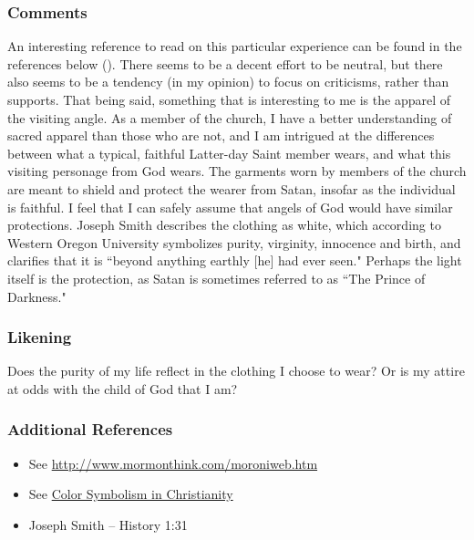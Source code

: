 \documentclass[12pt]{report}
\begin{document}
\subsubsection{Comments\label{js:comments4}}
An interesting reference to read on this particular experience can be found in the references below ().  There seems to be a decent effort to be neutral, but there also seems to be a tendency (in my opinion) to focus on criticisms, rather than supports.  That being said, something that is interesting to me is the apparel of the visiting angle.  As a member of the church, I have a better understanding of sacred apparel than those who are not, and I am intrigued at the differences between what a typical, faithful Latter-day Saint member wears, and what this visiting personage from God wears.  The garments worn by members of the church are meant to shield and protect the wearer from Satan, insofar as the individual is faithful.  I feel that I can safely assume that angels of God would have similar protections.  Joseph Smith describes the clothing as white, which according to Western Oregon University symbolizes purity, virginity, innocence and birth, and clarifies that it is ``beyond anything earthly [he] had ever seen."  Perhaps the light itself is the protection, as Satan is sometimes referred to as ``The Prince of Darkness."

\subsubsection{Likening\label{js:likening4}}
Does the purity of my life reflect in the clothing I choose to wear?  Or is my attire at odds with the child of God that I am?  

\subsubsection{Additional References\label{js:references4}}
\begin{itemize}
\item See \url{http://www.mormonthink.com/moroniweb.htm}
\item See \href{https://www.wou.edu/wp/exhibits/files/2015/07/christianity.pdf}{Color Symbolism in Christianity}
\item Joseph Smith -- History 1:31
\end{itemize}
\end{document}
